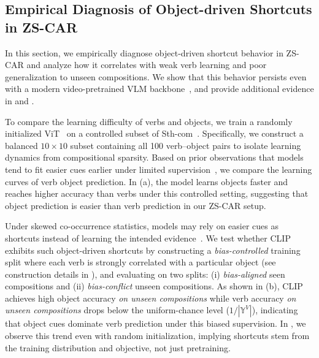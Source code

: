 

\subsection{Empirical Diagnosis of Object-driven Shortcuts in ZS-CAR}

In this section, we empirically diagnose object-driven shortcut behavior in ZS-CAR and analyze how it correlates with weak verb learning and poor generalization to unseen compositions.
We show that this behavior persists even with a modern video-pretrained VLM backbone~\cite{wang2024iv2}, and provide additional evidence in  and .




To compare the learning difficulty of verbs and objects, we train a randomly initialized ViT~\cite{dosovitskiy202vit} on a controlled subset of Sth-com~\cite{li2024c2c}.
Specifically, we construct a balanced $10\times10$ subset containing all 100 verb--object pairs to isolate learning dynamics from compositional sparsity.
Based on prior observations that models tend to fit easier cues earlier under limited supervision~\cite{nam2020lff, scimeca2022shortcut}, we compare the learning curves of verb \vs object prediction.
In  (a), the model learns objects faster and reaches higher accuracy than verbs under this controlled setting, suggesting that object prediction is easier than verb prediction in our ZS-CAR setup.




Under skewed co-occurrence statistics, models may rely on easier cues as shortcuts instead of learning the intended evidence~\cite{nam2020lff, scimeca2022shortcut, geirhos2018cuecon, bahng2019rebias, li2018resound, whycantchoi}.
We test whether CLIP exhibits such object-driven shortcuts by constructing a \emph{bias-controlled} training split where each verb is strongly correlated with a particular object (see construction details in ), and evaluating on two splits:
(i) \emph{bias-aligned} seen compositions and (ii) \emph{bias-conflict} unseen compositions.
As shown in  (b), CLIP achieves high object accuracy \emph{on unseen compositions} while verb accuracy \emph{on unseen compositions} drops below the uniform-chance level ($1/|\mathbb{Y}^V|$), indicating that object cues dominate verb prediction under this biased supervision.
In , we observe this trend even with random initialization, implying shortcuts stem from the training distribution and objective, not just pretraining.





